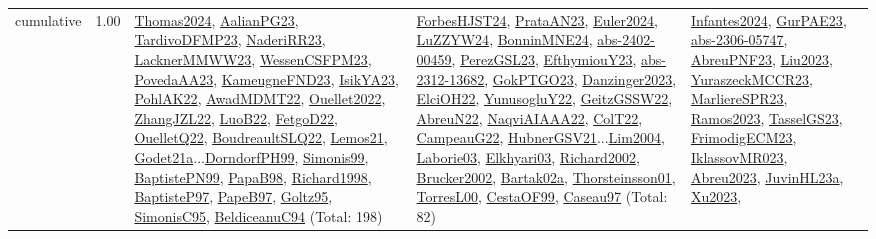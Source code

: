 {\begin{longtable}{p{3cm}r>{\raggedright\arraybackslash}p{6cm}>{\raggedright\arraybackslash}p{6cm}>{\raggedright\arraybackslash}p{8cm}}
\index{cumulative}\index{Constraints!cumulative}cumulative &  1.00 & \hyperref[detail:Thomas2024]{Thomas2024}, \hyperref[detail:AalianPG23]{AalianPG23}, \hyperref[detail:TardivoDFMP23]{TardivoDFMP23}, \hyperref[detail:NaderiRR23]{NaderiRR23}, \hyperref[detail:LacknerMMWW23]{LacknerMMWW23}, \hyperref[detail:WessenCSFPM23]{WessenCSFPM23}, \hyperref[detail:PovedaAA23]{PovedaAA23}, \hyperref[detail:KameugneFND23]{KameugneFND23}, \hyperref[detail:IsikYA23]{IsikYA23}, \hyperref[detail:PohlAK22]{PohlAK22}, \hyperref[detail:AwadMDMT22]{AwadMDMT22}, \hyperref[detail:Ouellet2022]{Ouellet2022}, \hyperref[detail:ZhangJZL22]{ZhangJZL22}, \hyperref[detail:LuoB22]{LuoB22}, \hyperref[detail:FetgoD22]{FetgoD22}, \hyperref[detail:OuelletQ22]{OuelletQ22}, \hyperref[detail:BoudreaultSLQ22]{BoudreaultSLQ22}, \hyperref[detail:Lemos21]{Lemos21}, \hyperref[detail:Godet21a]{Godet21a}...\hyperref[detail:DorndorfPH99]{DorndorfPH99}, \hyperref[detail:Simonis99]{Simonis99}, \hyperref[detail:BaptistePN99]{BaptistePN99}, \hyperref[detail:PapaB98]{PapaB98}, \hyperref[detail:Richard1998]{Richard1998}, \hyperref[detail:BaptisteP97]{BaptisteP97}, \hyperref[detail:PapeB97]{PapeB97}, \hyperref[detail:Goltz95]{Goltz95}, \hyperref[detail:SimonisC95]{SimonisC95}, \hyperref[detail:BeldiceanuC94]{BeldiceanuC94} (Total: 198) & \hyperref[detail:ForbesHJST24]{ForbesHJST24}, \hyperref[detail:PrataAN23]{PrataAN23}, \hyperref[detail:Euler2024]{Euler2024}, \hyperref[detail:LuZZYW24]{LuZZYW24}, \hyperref[detail:BonninMNE24]{BonninMNE24}, \hyperref[detail:abs-2402-00459]{abs-2402-00459}, \hyperref[detail:PerezGSL23]{PerezGSL23}, \hyperref[detail:EfthymiouY23]{EfthymiouY23}, \hyperref[detail:abs-2312-13682]{abs-2312-13682}, \hyperref[detail:GokPTGO23]{GokPTGO23}, \hyperref[detail:Danzinger2023]{Danzinger2023}, \hyperref[detail:ElciOH22]{ElciOH22}, \hyperref[detail:YunusogluY22]{YunusogluY22}, \hyperref[detail:GeitzGSSW22]{GeitzGSSW22}, \hyperref[detail:AbreuN22]{AbreuN22}, \hyperref[detail:NaqviAIAAA22]{NaqviAIAAA22}, \hyperref[detail:ColT22]{ColT22}, \hyperref[detail:CampeauG22]{CampeauG22}, \hyperref[detail:HubnerGSV21]{HubnerGSV21}...\hyperref[detail:Lim2004]{Lim2004}, \hyperref[detail:Laborie03]{Laborie03}, \hyperref[detail:Elkhyari03]{Elkhyari03}, \hyperref[detail:Richard2002]{Richard2002}, \hyperref[detail:Brucker2002]{Brucker2002}, \hyperref[detail:Bartak02a]{Bartak02a}, \hyperref[detail:Thorsteinsson01]{Thorsteinsson01}, \hyperref[detail:TorresL00]{TorresL00}, \hyperref[detail:CestaOF99]{CestaOF99}, \hyperref[detail:Caseau97]{Caseau97} (Total: 82) & \hyperref[detail:Infantes2024]{Infantes2024}, \hyperref[detail:GurPAE23]{GurPAE23}, \hyperref[detail:abs-2306-05747]{abs-2306-05747}, \hyperref[detail:AbreuPNF23]{AbreuPNF23}, \hyperref[detail:Liu2023]{Liu2023}, \hyperref[detail:YuraszeckMCCR23]{YuraszeckMCCR23}, \hyperref[detail:MarliereSPR23]{MarliereSPR23}, \hyperref[detail:Ramos2023]{Ramos2023}, \hyperref[detail:TasselGS23]{TasselGS23}, \hyperref[detail:FrimodigECM23]{FrimodigECM23}, \hyperref[detail:IklassovMR023]{IklassovMR023}, \hyperref[detail:Abreu2023]{Abreu2023}, \hyperref[detail:JuvinHL23a]{JuvinHL23a}, \hyperref[detail:Xu2023]{Xu2023}, 
\end{longtable}}
